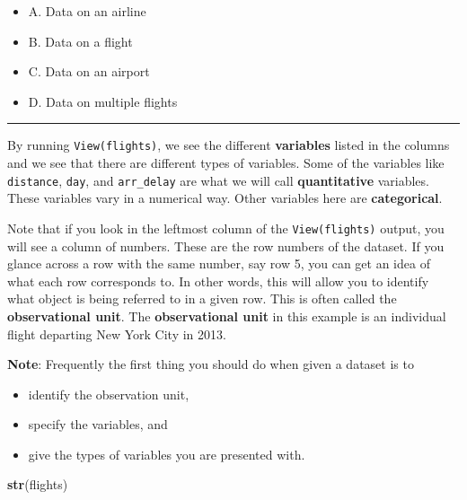 \documentclass[]{tufte-book}
\newenvironment{Shaded}{\begin{snugshade}}{\end{snugshade}}
\newcommand{\KeywordTok}[1]{\textcolor[rgb]{0.13,0.29,0.53}{\textbf{{#1}}}}
\newcommand{\NormalTok}[1]{{#1}}
\let\oldrule=\rule
\renewcommand{\rule}[1]{\oldrule{\linewidth}}
\providecommand{\tightlist}{%
  \setlength{\itemsep}{0pt}\setlength{\parskip}{0pt}}
\begin{document}
\begin{itemize}
\tightlist
\item
  A. Data on an airline
\item
  B. Data on a flight
\item
  C. Data on an airport
\item
  D. Data on multiple flights
\end{itemize}

\begin{center}\rule{0.5\linewidth}{\linethickness}\end{center}

By running \texttt{View(flights)}, we see the different
\textbf{variables} listed in the columns and we see that there are
different types of variables. Some of the variables like
\texttt{distance}, \texttt{day}, and \texttt{arr\_delay} are what we
will call \textbf{quantitative} variables. These variables vary in a
numerical way. Other variables here are \textbf{categorical}.

Note that if you look in the leftmost column of the
\texttt{View(flights)} output, you will see a column of numbers. These
are the row numbers of the dataset. If you glance across a row with the
same number, say row 5, you can get an idea of what each row corresponds
to. In other words, this will allow you to identify what object is being
referred to in a given row. This is often called the
\textbf{observational unit}. The \textbf{observational unit} in this
example is an individual flight departing New York City in 2013.

\textbf{Note}: Frequently the first thing you should do when given a
dataset is to

\begin{itemize}
\tightlist
\item
  identify the observation unit,
\item
  specify the variables, and
\item
  give the types of variables you are presented with.
\end{itemize}

\begin{Shaded}
\begin{Highlighting}[]
\KeywordTok{str}\NormalTok{(flights)}
\end{Highlighting}
\end{Shaded}
\end{document}

